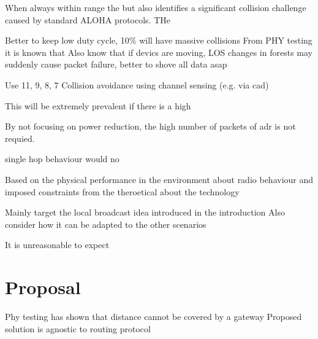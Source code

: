 When always within range the 
but also identifies a significant collision challenge caused by standard ALOHA protocols. THe 

Better to keep low duty cycle, 10\% will have massive collisions
From PHY testing it is known that 
Also know that if devics are moving, LOS changes in forests may suddenly cause packet failure, better to shove all data asap
 
Use 11, 9, 8, 7
Collision avoidance using channel sensing (e.g. via \ac{cad})

This will be extremely prevalent if there is a high 

By not focusing on power reduction, the high number of packets of adr is not requied.

single hop behaviour would no


Based on the physical performance in the environment about radio behaviour and imposed constraints from the theroetical about the technology  

Mainly target the local broadcast idea introduced in the introduction
Also consider how it can be adapted to  the other scenarios


It is unreasonable to expect 
\section{Proposal}

Phy testing has shown that distance cannot be covered by a gateway
Proposed solution is agnostic to routing protocol

%


 



